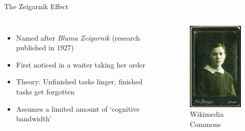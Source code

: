 \documentclass[aspectratio=169]{beamer}
\begin{document}
    {
    \begin{frame}{The Zeigarnik Effect}
        \begin{columns}[T,onlytextwidth]
                \vspace{3em}
                \begin{itemize}
                    \item Named after \emph{Bluma Zeigarnik} (research published in 1927)
                    \item First noticed in a waiter taking her order
                    \item Theory: Unfinished tasks linger, finished tasks get forgotten
                    \item Assumes a limited amount of \alert{`cognitive bandwidth'}
                \end{itemize}
                \begin{figure}[h]
                    \centering
                    \includegraphics[width=90pt,keepaspectratio]{images/08_bluma_zeigarnik.jpg}
                    \caption{Wikimedia Commons}
                \end{figure}
        \end{columns}
    \end{frame}
    }
\end{document}
